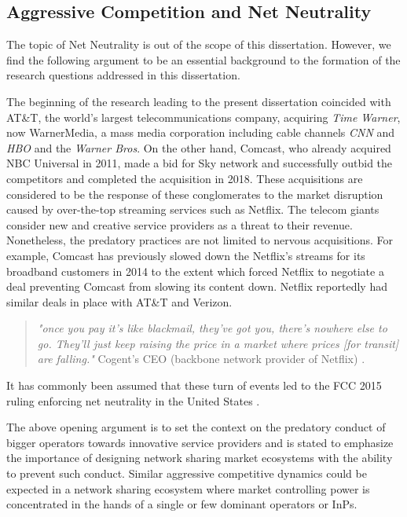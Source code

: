 \subsection{Aggressive Competition and Net Neutrality}
\label{Back:Sec:sharing:sub:competition}
The topic of Net Neutrality is out of the scope of this dissertation. However, we find the following argument to be an essential background to the formation of the research questions addressed in this dissertation.

The beginning of the research leading to the present dissertation coincided with AT\&T, the world's largest telecommunications company, acquiring \textit{Time Warner}, now WarnerMedia, a mass media corporation including cable channels \textit{CNN} and \textit{HBO} and the \textit{Warner Bros}. On the other hand, Comcast, who already acquired NBC Universal in 2011, made a bid for Sky network and successfully outbid the competitors and completed the acquisition in 2018. These acquisitions are considered to be the response of these conglomerates to the market disruption caused by over-the-top streaming services such as Netflix. The telecom giants consider new and creative service providers as a threat to their revenue. Nonetheless, the predatory practices are not limited to nervous acquisitions. For example, Comcast has previously slowed down the Netflix's streams for its broadband customers in 2014 to the extent which forced Netflix to negotiate a deal preventing Comcast from slowing its content down. Netflix reportedly had similar deals in place with AT\&T and Verizon. 
\vspace{-5pt}
\begin{quote}
  \textit{"once you pay it's like blackmail, they've got you, there's nowhere else to go. They'll just keep raising the price in a market where prices [for transit] are falling."}
  Cogent's CEO (backbone network provider of Netflix) \cite{lee_comcasts_2014}.
\end{quote}
\vspace{-5pt}

It has commonly been assumed that these turn of events led to the \ac{FCC} 2015 ruling enforcing net neutrality in the United States \cite{lindeberg2019coordinating}. 

The above opening argument is to set the context on the predatory conduct of bigger operators towards innovative service providers and is stated to emphasize the importance of designing network sharing market ecosystems with the ability to prevent such conduct. Similar aggressive competitive dynamics could be expected in a network sharing ecosystem where market controlling power is concentrated in the hands of a single or few dominant operators or \acp{InP}.

